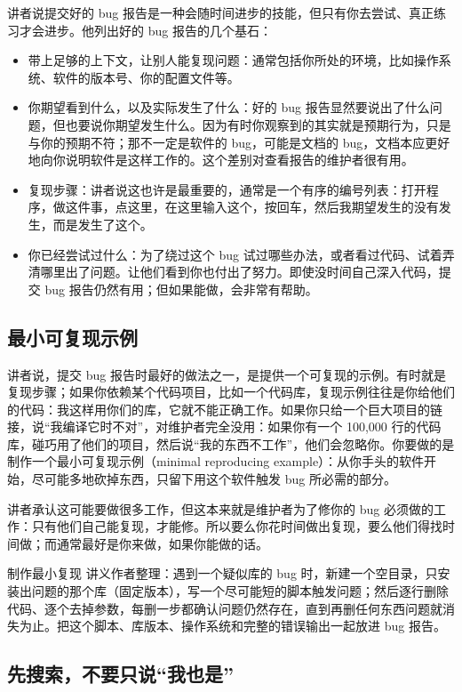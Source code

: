 \documentclass[a4paper]{article}
\begin{document}
讲者说提交好的 bug 报告是一种会随时间进步的技能，但只有你去尝试、真正练习才会进步。他列出好的 bug 报告的几个基石：
\begin{itemize}
\item 带上足够的上下文，让别人能复现问题：通常包括你所处的环境，比如操作系统、软件的版本号、你的配置文件等。
\item 你期望看到什么，以及实际发生了什么：好的 bug 报告显然要说出了什么问题，但也要说你期望发生什么。因为有时你观察到的其实就是预期行为，只是与你的预期不符；那不一定是软件的 bug，可能是文档的 bug，文档本应更好地向你说明软件是这样工作的。这个差别对查看报告的维护者很有用。
\item 复现步骤：讲者说这也许是最重要的，通常是一个有序的编号列表：打开程序，做这件事，点这里，在这里输入这个，按回车，然后我期望发生的没有发生，而是发生了这个。
\item 你已经尝试过什么：为了绕过这个 bug 试过哪些办法，或者看过代码、试着弄清哪里出了问题。让他们看到你也付出了努力。即使没时间自己深入代码，提交 bug 报告仍然有用；但如果能做，会非常有帮助。
\end{itemize}

\subsection{最小可复现示例}

讲者说，提交 bug 报告时最好的做法之一，是提供一个可复现的示例。有时就是复现步骤；如果你依赖某个代码项目，比如一个代码库，复现示例往往是你给他们的代码：我这样用你们的库，它就不能正确工作。如果你只给一个巨大项目的链接，说“我编译它时不对”，对维护者完全没用：如果你有一个 100,000 行的代码库，碰巧用了他们的项目，然后说“我的东西不工作”，他们会忽略你。你要做的是制作一个最小可复现示例（minimal reproducing example）：从你手头的软件开始，尽可能多地砍掉东西，只留下用这个软件触发 bug 所必需的部分。

讲者承认这可能要做很多工作，但这本来就是维护者为了修你的 bug 必须做的工作：只有他们自己能复现，才能修。所以要么你花时间做出复现，要么他们得找时间做；而通常最好是你来做，如果你能做的话。

\begin{practicebox}{制作最小复现}
讲义作者整理：遇到一个疑似库的 bug 时，新建一个空目录，只安装出问题的那个库（固定版本），写一个尽可能短的脚本触发问题；然后逐行删除代码、逐个去掉参数，每删一步都确认问题仍然存在，直到再删任何东西问题就消失为止。把这个脚本、库版本、操作系统和完整的错误输出一起放进 bug 报告。
\end{practicebox}

\subsection{先搜索，不要只说“我也是”}
\end{document}
